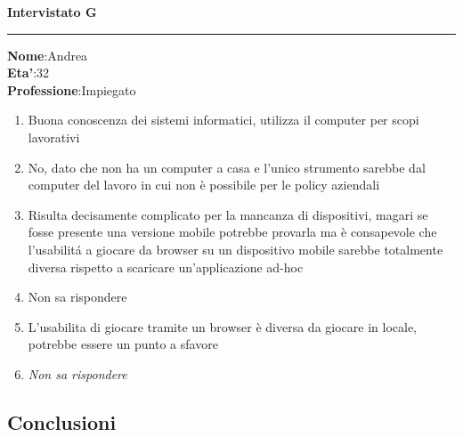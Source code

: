 \documentclass[../Report.tex]{subfiles}
\begin{document}
    \textbf{Intervistato G}\\
    \hrule
    \textbf{Nome}:Andrea\\
    \textbf{Eta'}:32\\
    \textbf{Professione}:Impiegato\\

    \begin{enumerate}
        \item Buona conoscenza dei sistemi informatici, utilizza il computer per scopi lavorativi
        \item No, dato che non ha un computer a casa e l’unico strumento sarebbe dal computer del lavoro in cui non è possibile per le policy aziendali 
        \item Risulta decisamente complicato per la mancanza di dispositivi, magari se fosse presente una versione mobile potrebbe provarla ma è consapevole che l’usabilitá a giocare da browser su un dispositivo mobile sarebbe totalmente diversa rispetto a scaricare un’applicazione ad-hoc
        \item Non sa rispondere
        \item L’usabilita di giocare tramite un browser è diversa da giocare in locale, potrebbe essere un punto a sfavore
        \item \textit{Non sa rispondere}    
    \end{enumerate}

    \newpage
    \subsection{Conclusioni}
\end{document}
